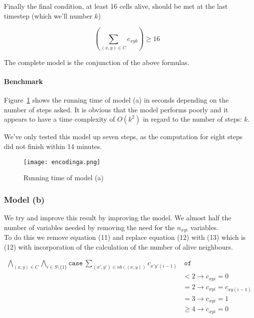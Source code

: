\documentclass[12pt]{article}
\begin{document}
\vspace{3mm}

Finally the final condition, at least 16 cells alive, should be met at the 
last timestep (which we'll number $k$)

\begin{equation*}
	\left( \sum_{(x,y) \in C} c_{xyk} \right) \geq 16
\end{equation*}

\vspace{3mm}

The complete model is the conjunction of the above formulas.

\paragraph{Benchmark} Figure~\ref{fig:modart} shows the running time of model 
(a) in seconds depending on the number of steps asked. It is obvious that the 
model performs poorly and it appears to have a time complexity of $O(k^2)$ 
in regard to the number of steps: $k$.

We've only tested this model up seven steps, as the computation for eight steps
did not finish within 14 minutes. 

\begin{figure}
\texttt{[image: encodinga.png]}
\caption{Running time of model (a)}
\label{fig:modart}
\end{figure}

\subsubsection*{Model (b)}
We try and improve this result by improving the model. We almost half the
number of variables needed by removing the need for the $n_{xyi}$ variables.\\  

To do this we remove equation (11) and replace equation (12) with (13) which is
(12) with incorporation of the calculation of the number of alive neighbours.

\begin{equation}
\begin{aligned}
    \bigwedge_{(x,y) \in C} \bigwedge_{i \in S \setminus \{1\}} 
        \mathtt{case~} \sum_{(x',y') \in nb((x,y))} c_{x'y'(i-1)} &\mathtt{~of }\\   
        &< 2 \to c_{xyi} = 0\\  
        &= 2 \to c_{xyi} = c_{xy(i-1)}\\  
        &= 3 \to c_{xyi} = 1\\  
        &\geq 4 \to c_{xyi} = 0
\end{aligned}
\end{equation}
\end{document}
